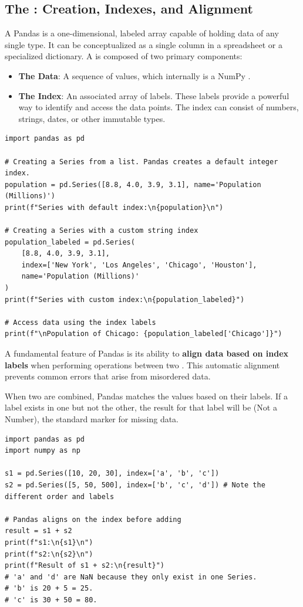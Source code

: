 \subsection{The : Creation, Indexes, and Alignment}
\label{subsec:pandas_series}
A Pandas  is a one-dimensional, labeled array capable of holding data of any single type. It can be conceptualized as a single column in a spreadsheet or a specialized dictionary. A  is composed of two primary components:
\begin{itemize}
    \item \textbf{The Data}: A sequence of values, which internally is a NumPy .
    \item \textbf{The Index}: An associated array of labels. These labels provide a powerful way to identify and access the data points. The index can consist of numbers, strings, dates, or other immutable types.
\end{itemize}

\text{ }\begin{verbatim}
import pandas as pd

# Creating a Series from a list. Pandas creates a default integer index.
population = pd.Series([8.8, 4.0, 3.9, 3.1], name='Population (Millions)')
print(f"Series with default index:\n{population}\n")

# Creating a Series with a custom string index
population_labeled = pd.Series(
    [8.8, 4.0, 3.9, 3.1],
    index=['New York', 'Los Angeles', 'Chicago', 'Houston'],
    name='Population (Millions)'
)
print(f"Series with custom index:\n{population_labeled}")

# Access data using the index labels
print(f"\nPopulation of Chicago: {population_labeled['Chicago']}")
\end{verbatim}

A fundamental feature of Pandas is its ability to \textbf{align data based on index labels} when performing operations between two . This automatic alignment prevents common errors that arise from misordered data.

\begin{example}
When two  are combined, Pandas matches the values based on their labels. If a label exists in one  but not the other, the result for that label will be  (Not a Number), the standard marker for missing data.
\text{ }\begin{verbatim}
import pandas as pd
import numpy as np

s1 = pd.Series([10, 20, 30], index=['a', 'b', 'c'])
s2 = pd.Series([5, 50, 500], index=['b', 'c', 'd']) # Note the different order and labels

# Pandas aligns on the index before adding
result = s1 + s2
print(f"s1:\n{s1}\n")
print(f"s2:\n{s2}\n")
print(f"Result of s1 + s2:\n{result}")
# 'a' and 'd' are NaN because they only exist in one Series.
# 'b' is 20 + 5 = 25.
# 'c' is 30 + 50 = 80.
\end{verbatim}
\end{example}


